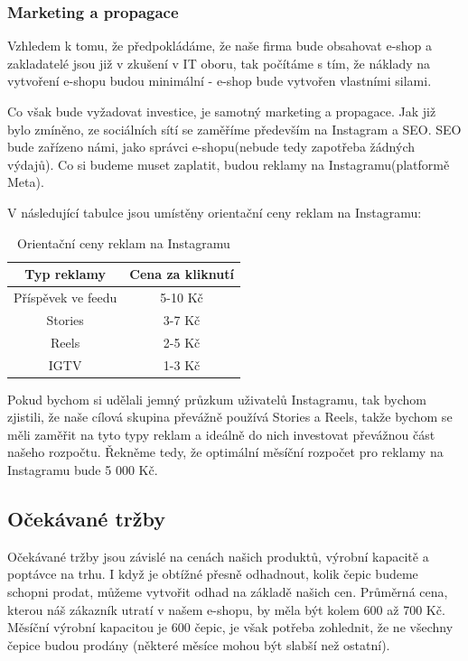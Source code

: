 \documentclass[12pt, a4paper]{article}
\begin{document}
\pagebreak

\subsubsection{Marketing a propagace}

Vzhledem k tomu, že předpokládáme, že naše firma bude obsahovat e-shop a
zakladatelé jsou již v zkušení v IT oboru, tak
počítáme s tím, že náklady na vytvoření e-shopu budou minimální - e-shop
bude vytvořen vlastními silami.

\vspace{10pt}
\noindent Co však bude vyžadovat investice, je samotný marketing a propagace.
Jak již bylo zmíněno, ze sociálních sítí se zaměříme především na Instagram a SEO.
SEO bude zařízeno námi, jako správci e-shopu(nebude tedy zapotřeba žádných výdajů). Co si budeme
muset zaplatit, budou reklamy na Instagramu(platformě Meta).

\noindent V následující tabulce jsou umístěny orientační ceny reklam na Instagramu:

\begin{table}[h]
  \centering
  \begin{tabular}{ |c|c| }
    \hline
    \textbf{Typ reklamy} & \textbf{Cena za kliknutí} \\
    \hline
    \hline
    Příspěvek ve feedu & 5-10 Kč \\
    \hline
    Stories & 3-7 Kč \\
    \hline
    Reels & 2-5 Kč \\
    \hline
    IGTV & 1-3 Kč \\
    \hline
  \end{tabular}
  \caption{Orientační ceny reklam na Instagramu \cite{reklamy-ig-zoomstudio}}
\end{table}

\noindent Pokud bychom si udělali jemný průzkum uživatelů Instagramu, tak bychom zjistili, že
naše cílová skupina převážně používá Stories a Reels, takže bychom se měli zaměřit na tyto typy reklam
a ideálně do nich investovat převážnou část našeho rozpočtu. Řekněme tedy, že optimální měsíční
rozpočet pro reklamy na Instagramu bude 5 000 Kč.

\subsection{Očekávané tržby}

Očekávané tržby jsou závislé na cenách našich produktů, výrobní kapacitě a poptávce na trhu.
I když je obtížné přesně odhadnout, kolik čepic budeme schopni prodat, můžeme vytvořit odhad na základě našich cen.
Průměrná cena, kterou náš zákazník utratí v našem e-shopu, by měla být kolem 600 až 700 Kč.
Měsíční výrobní kapacitou je 600 čepic, je však potřeba zohlednit, že ne všechny čepice budou prodány
(některé měsíce mohou být slabší než ostatní).
\end{document}
